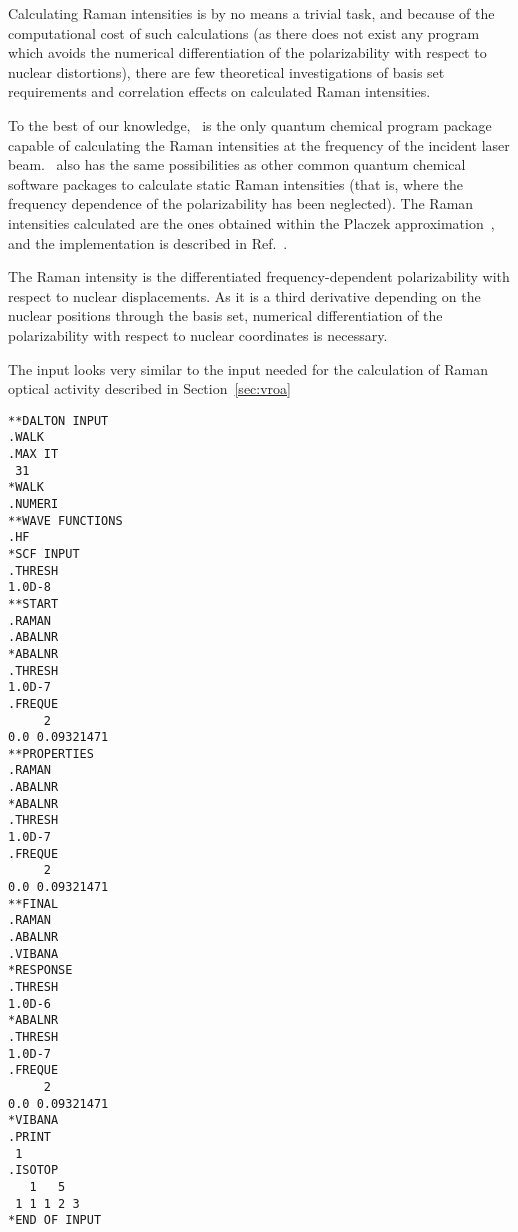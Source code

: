 \begin{center}
\end{center}

 Calculating Raman intensities is by no means
a trivial task, and
because of the computational cost of such calculations (as there does
not exist any program which avoids the numerical differentiation of the
polarizability with respect to nuclear distortions), there are
few theoretical investigations of basis set requirements and
correlation effects on calculated Raman intensities.

To the best of our knowledge, \siraba\ is the only quantum chemical program package capable of
calculating the Raman intensities at the frequency of the incident
laser beam. \siraba\ also has the same possibilities as other
common quantum chemical software packages to calculate static
Raman intensities (that is, where the frequency dependence of the
polarizability has been neglected). The Raman intensities calculated
are the ones obtained within the Placzek
approximation~\cite{placzek},
and the implementation is described in Ref.~\cite{thkrklbpjjofd99}.

The Raman intensity is the differentiated frequency-dependent
polarizability with respect to nuclear displacements.
As it is a third derivative depending on the nuclear positions through
the basis set, numerical differentiation of
the polarizability with respect to nuclear coordinates is
necessary.

The input looks very similar to the input needed for the calculation
of Raman optical activity  described
in Section~\ref{sec:vroa}

\begin{verbatim}
**DALTON INPUT
.WALK
.MAX IT
 31
*WALK
.NUMERI
**WAVE FUNCTIONS
.HF
*SCF INPUT
.THRESH
1.0D-8
**START
.RAMAN
.ABALNR
*ABALNR
.THRESH
1.0D-7
.FREQUE
     2
0.0 0.09321471
**PROPERTIES
.RAMAN
.ABALNR
*ABALNR
.THRESH
1.0D-7
.FREQUE
     2
0.0 0.09321471
**FINAL
.RAMAN
.ABALNR
.VIBANA
*RESPONSE
.THRESH
1.0D-6
*ABALNR
.THRESH
1.0D-7
.FREQUE
     2
0.0 0.09321471
*VIBANA
.PRINT
 1
.ISOTOP
   1   5
 1 1 1 2 3
*END OF INPUT
\end{verbatim}

